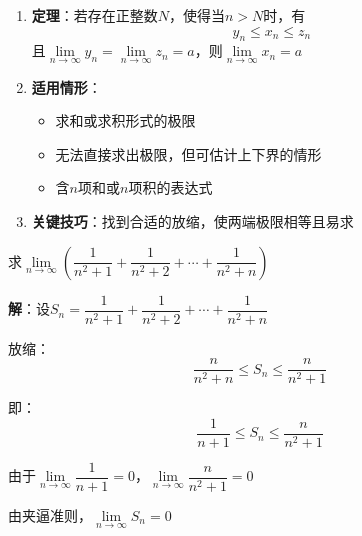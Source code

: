 \documentclass[a4paper,12pt]{article}
\begin{document}
    \begin{enumerate}
        \item \textbf{定理}：若存在正整数$N$，使得当$n > N$时，有
        \[
            y_n \le x_n \le z_n
        \]
        且$\lim\limits_{n\to\infty} y_n = \lim\limits_{n\to\infty} z_n = a$，则$\lim\limits_{n\to\infty} x_n = a$

        \item \textbf{适用情形}：
        \begin{itemize}
            \item 求和或求积形式的极限
            \item 无法直接求出极限，但可估计上下界的情形
            \item 含$n$项和或$n$项积的表达式
        \end{itemize}

        \item \textbf{关键技巧}：找到合适的放缩，使两端极限相等且易求
    \end{enumerate}

    \begin{analysisbox}[示例]
        求$\lim\limits_{n\to\infty} \left(\dfrac{1}{n^2+1} + \dfrac{1}{n^2+2} + \cdots + \dfrac{1}{n^2+n}\right)$

        \textbf{解}：设$S_n = \dfrac{1}{n^2+1} + \dfrac{1}{n^2+2} + \cdots + \dfrac{1}{n^2+n}$

        放缩：
        \[
            \frac{n}{n^2+n} \le S_n \le \frac{n}{n^2+1}
        \]

        即：
        \[
            \frac{1}{n+1} \le S_n \le \frac{n}{n^2+1}
        \]

        由于$\lim\limits_{n\to\infty} \dfrac{1}{n+1} = 0$，$\lim\limits_{n\to\infty} \dfrac{n}{n^2+1} = 0$

        由夹逼准则，$\lim\limits_{n\to\infty} S_n = 0$
    \end{analysisbox}
\end{document}
